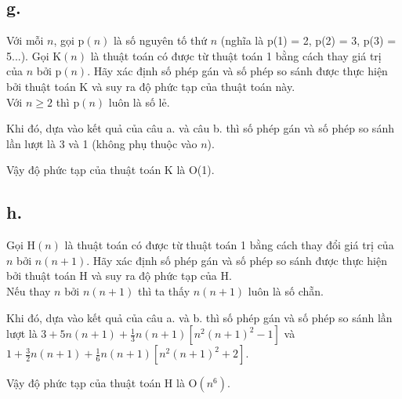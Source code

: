 \documentclass[12pt, a4paper, fleqn]{article}
\begin{document}
	\subsection*{g.}
	
	Với mỗi $n$, gọi p$(n)$ là số nguyên tố thứ $n$ (nghĩa là p(1) = 2, p(2) = 3, p(3) = 5...). Gọi K$(n)$ là thuật toán có được từ thuật toán 1 bằng cách thay giá trị của $n$ bởi p$(n)$. Hãy xác định số phép gán và số phép so sánh được thực hiện bởi thuật toán K và suy ra độ phức tạp của thuật toán này. \\
	
	Với $n \geq 2$ thì p$(n)$ luôn là số lẻ.
	
	Khi đó, dựa vào kết quả của câu a. và câu b. thì số phép gán và số phép so sánh lần lượt là 3 và 1 (không phụ thuộc vào $n$).
	
	Vậy độ phức tạp của thuật toán K là O(1).
	
	\subsection*{h.}
	
	Gọi H$(n)$ là thuật toán có được từ thuật toán 1 bằng cách thay đổi giá trị của $n$ bởi $n(n + 1)$. Hãy xác định số phép gán và số phép so sánh được thực hiện bởi thuật toán H và suy ra độ phức tạp của H. \\
	
	Nếu thay $n$ bởi $n(n + 1)$ thì ta thấy $n(n + 1)$ luôn là số chẵn.
	
	Khi đó, dựa vào kết quả của câu a. và b. thì số phép gán và số phép so sánh lần lượt là $\displaystyle 3 + 5n(n + 1) + \frac{1}{3} n(n + 1)[n^2(n + 1)^2 - 1]$ và $\displaystyle 1 + \frac{3}{2} n(n + 1) + \frac{1}{6} n(n + 1)[n^2(n + 1)^2 + 2]$.
	
	Vậy độ phức tạp của thuật toán H là O$(n^6)$.
\end{document}

